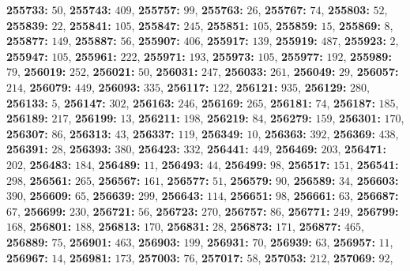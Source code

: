 \textsf{\bfseries 255733:} $50$, \textsf{\bfseries 255743:} $409$, \textsf{\bfseries 255757:} $99$, \textsf{\bfseries 255763:} $26$, \textsf{\bfseries 255767:} $74$, \textsf{\bfseries 255803:} $52$, \textsf{\bfseries 255839:} $22$, \textsf{\bfseries 255841:} $105$, \textsf{\bfseries 255847:} $245$, \textsf{\bfseries 255851:} $105$, \textsf{\bfseries 255859:} $15$, \textsf{\bfseries 255869:} $8$, \textsf{\bfseries 255877:} $149$, \textsf{\bfseries 255887:} $56$, \textsf{\bfseries 255907:} $406$, \textsf{\bfseries 255917:} $139$, \textsf{\bfseries 255919:} $487$, \textsf{\bfseries 255923:} $2$, \textsf{\bfseries 255947:} $105$, \textsf{\bfseries 255961:} $222$, \textsf{\bfseries 255971:} $193$, \textsf{\bfseries 255973:} $105$, \textsf{\bfseries 255977:} $192$, \textsf{\bfseries 255989:} $79$, \textsf{\bfseries 256019:} $252$, \textsf{\bfseries 256021:} $50$, \textsf{\bfseries 256031:} $247$, \textsf{\bfseries 256033:} $261$, \textsf{\bfseries 256049:} $29$, \textsf{\bfseries 256057:} $214$, \textsf{\bfseries 256079:} $449$, \textsf{\bfseries 256093:} $335$, \textsf{\bfseries 256117:} $122$, \textsf{\bfseries 256121:} $935$, \textsf{\bfseries 256129:} $280$, \textsf{\bfseries 256133:} $5$, \textsf{\bfseries 256147:} $302$, \textsf{\bfseries 256163:} $246$, \textsf{\bfseries 256169:} $265$, \textsf{\bfseries 256181:} $74$, \textsf{\bfseries 256187:} $185$, \textsf{\bfseries 256189:} $217$, \textsf{\bfseries 256199:} $13$, \textsf{\bfseries 256211:} $198$, \textsf{\bfseries 256219:} $84$, \textsf{\bfseries 256279:} $159$, \textsf{\bfseries 256301:} $170$, \textsf{\bfseries 256307:} $86$, \textsf{\bfseries 256313:} $43$, \textsf{\bfseries 256337:} $119$, \textsf{\bfseries 256349:} $10$, \textsf{\bfseries 256363:} $392$, \textsf{\bfseries 256369:} $438$, \textsf{\bfseries 256391:} $28$, \textsf{\bfseries 256393:} $380$, \textsf{\bfseries 256423:} $332$, \textsf{\bfseries 256441:} $449$, \textsf{\bfseries 256469:} $203$, \textsf{\bfseries 256471:} $202$, \textsf{\bfseries 256483:} $184$, \textsf{\bfseries 256489:} $11$, \textsf{\bfseries 256493:} $44$, \textsf{\bfseries 256499:} $98$, \textsf{\bfseries 256517:} $151$, \textsf{\bfseries 256541:} $298$, \textsf{\bfseries 256561:} $265$, \textsf{\bfseries 256567:} $161$, \textsf{\bfseries 256577:} $51$, \textsf{\bfseries 256579:} $90$, \textsf{\bfseries 256589:} $34$, \textsf{\bfseries 256603:} $390$, \textsf{\bfseries 256609:} $65$, \textsf{\bfseries 256639:} $299$, \textsf{\bfseries 256643:} $114$, \textsf{\bfseries 256651:} $98$, \textsf{\bfseries 256661:} $63$, \textsf{\bfseries 256687:} $67$, \textsf{\bfseries 256699:} $230$, \textsf{\bfseries 256721:} $56$, \textsf{\bfseries 256723:} $270$, \textsf{\bfseries 256757:} $86$, \textsf{\bfseries 256771:} $249$, \textsf{\bfseries 256799:} $168$, \textsf{\bfseries 256801:} $188$, \textsf{\bfseries 256813:} $170$, \textsf{\bfseries 256831:} $28$, \textsf{\bfseries 256873:} $171$, \textsf{\bfseries 256877:} $465$, \textsf{\bfseries 256889:} $75$, \textsf{\bfseries 256901:} $463$, \textsf{\bfseries 256903:} $199$, \textsf{\bfseries 256931:} $70$, \textsf{\bfseries 256939:} $63$, \textsf{\bfseries 256957:} $11$, \textsf{\bfseries 256967:} $14$, \textsf{\bfseries 256981:} $173$, \textsf{\bfseries 257003:} $76$, \textsf{\bfseries 257017:} $58$, \textsf{\bfseries 257053:} $212$, \textsf{\bfseries 257069:} $92$, 
